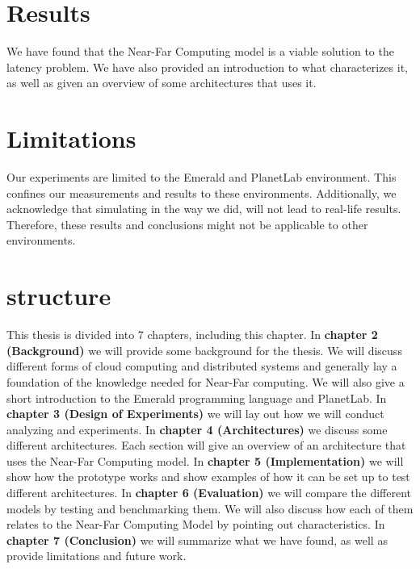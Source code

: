 \section{Results}
We have found that the Near-Far Computing model is a viable solution to the latency problem. We have also provided an introduction to what characterizes it, as well as given an overview of some architectures that uses it.

\section{Limitations}
Our experiments are limited to the Emerald and PlanetLab environment. This confines our measurements and results to these environments. Additionally, we acknowledge that simulating in the way we did, will not lead to real-life results. Therefore, these results and conclusions might not be applicable to other environments.



\section{structure}
This thesis is divided into 7 chapters, including this chapter. 
In \textbf{chapter 2 (Background)} we will provide some background for the thesis. We will discuss different forms of cloud computing and distributed systems and generally lay a foundation of the knowledge needed for Near-Far computing. We will also give a short introduction to the Emerald programming language and PlanetLab.
In \textbf{chapter 3 (Design of Experiments)} we will lay out how we will conduct analyzing and experiments.
In \textbf{chapter 4 (Architectures)} we discuss some different architectures. Each section will give an overview of an architecture that uses the Near-Far Computing model.
In \textbf{chapter 5 (Implementation)} we will show how the prototype works and show examples of how it can be set up to test different architectures.
In \textbf{chapter 6 (Evaluation)} we will compare the different models by testing and benchmarking them. We will also discuss how each of them relates to the Near-Far Computing Model by pointing out characteristics.
In \textbf{chapter 7 (Conclusion)} we will summarize what we have found, as well as provide limitations and future work.

